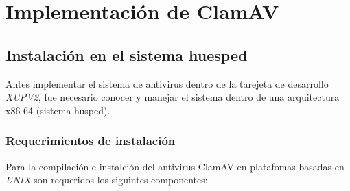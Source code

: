 
\chapter{Implementación de ClamAV}

\section{Instalación en el sistema  huesped}

Antes  implementar el sistema de antivirus dentro de la tarejeta de desarrollo 
\emph{XUPV2}, fue necesario conocer y manejar  el sistema dentro de una 
arquitectura x86-64 (sistema  husped).

\subsection{Requerimientos de instalación}

Para la compilaci\'on e instalci\'on del antivirus ClamAV en platafomas  
basadas en \emph{UNIX} son requeridos los siguintes componentes:

